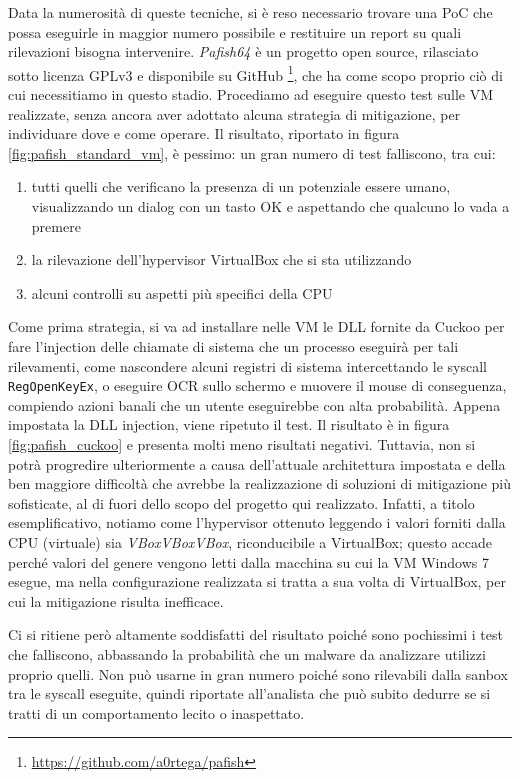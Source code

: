 Data la numerosità di queste tecniche, si è reso necessario trovare una PoC che possa eseguirle in maggior numero possibile e restituire un report su quali rilevazioni bisogna intervenire. \emph{Pafish64} è un progetto open source, rilasciato sotto licenza GPLv3 e disponibile su GitHub
\footnote{\url{https://github.com/a0rtega/pafish}},
che ha come scopo proprio ciò di cui necessitiamo in questo stadio.
Procediamo ad eseguire questo test sulle VM realizzate, senza ancora aver adottato alcuna strategia di mitigazione, per individuare dove e come operare. Il risultato, riportato in figura \ref{fig:pafish_standard_vm}, è pessimo: un gran numero di test falliscono, tra cui:
\begin{enumerate}
    \item tutti quelli che verificano la presenza di un potenziale essere umano,
    visualizzando un dialog con un tasto OK e aspettando che qualcuno lo vada a premere
    \item la rilevazione dell'hypervisor VirtualBox che si sta utilizzando
    \item alcuni controlli su aspetti più specifici della CPU
\end{enumerate}

Come prima strategia, si va ad installare nelle VM le DLL fornite da Cuckoo per fare l'injection delle chiamate di sistema che un processo eseguirà per tali rilevamenti, come nascondere alcuni registri di sistema intercettando le syscall \texttt{RegOpenKeyEx}, o eseguire OCR sullo schermo e muovere il mouse di conseguenza, compiendo azioni banali che un utente eseguirebbe con alta probabilità.
Appena impostata la DLL injection, viene ripetuto il test. Il risultato è in figura \ref{fig:pafish_cuckoo} e presenta molti meno risultati negativi.
Tuttavia, non si potrà progredire ulteriormente a causa dell'attuale architettura impostata e della ben maggiore difficoltà che avrebbe la realizzazione di soluzioni di mitigazione più sofisticate, al di fuori dello scopo del progetto qui realizzato.
Infatti, a titolo esemplificativo, notiamo come l'hypervisor ottenuto leggendo i valori forniti dalla CPU (virtuale) sia \emph{VBoxVBoxVBox}, riconducibile a VirtualBox; questo accade perché valori del genere vengono letti dalla macchina su cui la VM Windows 7 esegue, ma nella configurazione realizzata si tratta a sua volta di VirtualBox, per cui la mitigazione risulta inefficace.

Ci si ritiene però altamente soddisfatti del risultato poiché sono pochissimi i test che falliscono, abbassando la probabilità che un malware da analizzare utilizzi proprio quelli. Non può usarne in gran numero poiché sono rilevabili dalla sanbox tra le syscall eseguite, quindi riportate all'analista che può subito dedurre se si tratti di un comportamento lecito o inaspettato.

